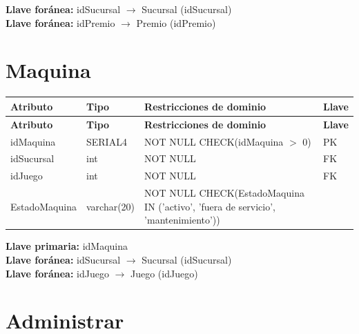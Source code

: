 \documentclass[12pt]{article}
\begin{document}
\vspace{2pt}
\textbf{Llave foránea:} idSucursal $\rightarrow$ Sucursal (idSucursal)\\
\textbf{Llave foránea:} idPremio $\rightarrow$ Premio (idPremio)\\


\section*{Maquina}

\begin{longtable}{p{3.5cm} p{2.5cm} p{7.5cm} p{1.5cm}}
\label{tab:maquina}\\
\toprule
\textbf{Atributo} & \textbf{Tipo} & \textbf{Restricciones de dominio} & \textbf{Llave} \\
\midrule
\endfirsthead

\toprule
\textbf{Atributo} & \textbf{Tipo} & \textbf{Restricciones de dominio} & \textbf{Llave} \\
\midrule
\endhead
\bottomrule
\endfoot

idMaquina 
& SERIAL4 
& NOT NULL \newline CHECK(idMaquina $>$ 0)
& PK \\

idSucursal 
& int 
& NOT NULL 
& FK \\

idJuego 
& int 
& NOT NULL 
& FK \\

EstadoMaquina 
& varchar(20) 
& NOT NULL \newline CHECK(EstadoMaquina IN ('activo', 'fuera de servicio', 'mantenimiento'))
& \\

\end{longtable}

\vspace{2pt}
\textbf{Llave primaria:} idMaquina\\
\textbf{Llave foránea:} idSucursal $\rightarrow$ Sucursal (idSucursal)\\
\textbf{Llave foránea:} idJuego $\rightarrow$ Juego (idJuego)\\

\section*{Administrar}
\end{document}
